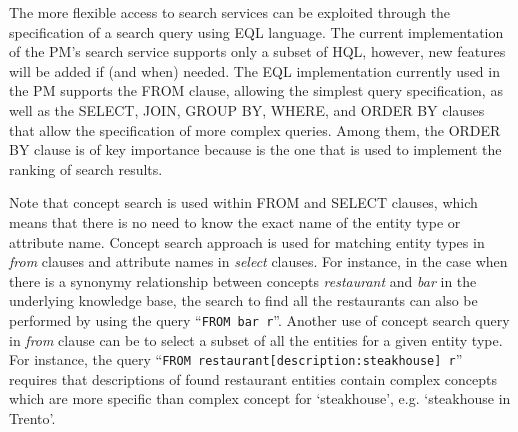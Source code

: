The more flexible access to search services can be exploited through the specification of a search query using EQL language. The current implementation of the PM's search service supports only a subset of HQL, however, new features will be added if (and when) needed. The EQL implementation currently used in the PM supports the FROM clause, allowing the simplest query specification, as well as the SELECT, JOIN, GROUP BY, WHERE, and ORDER BY clauses that allow the specification of more complex queries. Among them, the ORDER BY clause is of key importance because is the one that is used to implement the ranking of search results. 

Note that concept search is used within FROM and SELECT clauses, which means that there is no need to know the exact name of the entity type or attribute name. Concept search approach is used for matching entity types in \emph{from} clauses and attribute names in \emph{select} clauses. 
 For instance, in the case when there is a synonymy relationship between concepts \emph{restaurant} and \emph{bar} in the underlying knowledge base, the search to find all the restaurants can also be performed by using the query ``\texttt{FROM bar r}''.
Another use of concept search query in \emph{from} clause can be to select a subset of all the entities for a given entity type. For instance, the query ``\texttt{FROM restaurant[description:steakhouse] r}'' requires that descriptions of found restaurant entities contain complex concepts which are more specific than complex concept for `steakhouse', e.g. `steakhouse in Trento'. 



